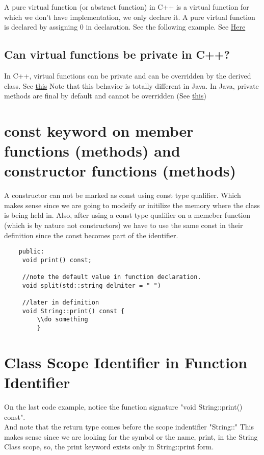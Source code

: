 \documentclass[11pt,twoside,a4paper]{report}
\begin{document}
A pure virtual function (or abstract function) in C++ is a virtual function for which we don’t have implementation, we only declare it. A pure virtual function is declared by assigning 0 in declaration. See the following example.
See \href{https://www.geeksforgeeks.org/pure-virtual-functions-and-abstract-classes/}{Here}

\subsection{Can virtual functions be private in C++?}
In C++, virtual functions can be private and can be overridden by the derived class. See \href{https://www.geeksforgeeks.org/can-virtual-functions-be-private-in-c/}{this}
Note that this behavior is totally different in Java. In Java, private methods are final by default and cannot be overridden (See \href{https://www.geeksforgeeks.org/can-override-private-methods-java/}{this})

\section{const keyword on member functions (methods) and constructor functions (methods)}
A constructor can not be marked as const using const type qualifier. Which makes sense since we are going to modeify or initilize the memory where the class is being held in.
Also, after using a const type qualifier on a memeber function (which is by nature not constructors) we have to use the same const in their definition since the const becomes part of the
identifier.

\begin{lstlisting}
    public:
     void print() const;

     //note the default value in function declaration.
     void split(std::string delmiter = " ")

     //later in definition
     void String::print() const {
         \\do something
         }
\end{lstlisting}

\section{Class Scope Identifier in Function Identifier}
On the last code example, notice the function signature "void String::print() const".\\
And note that the return type comes before the scope indentifier "String::" This makes sense since we are looking for the symbol or the name, print, in the String Class scope,
so, the print keyword exists only in String::print form.
\end{document}
